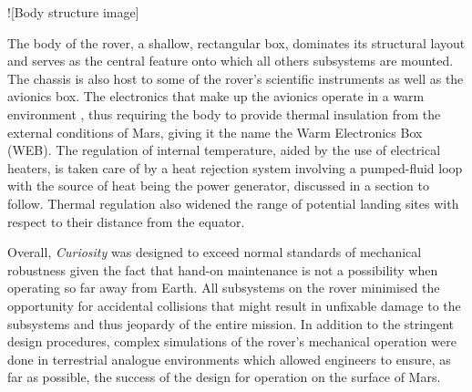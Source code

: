         ![Body structure image]
        
        The body of the rover, a shallow, rectangular box, dominates its structural layout and serves as the central feature onto which all others subsystems are mounted. The chassis is also host to some of the rover's scientific instruments as well as the avionics box. The electronics that make up the avionics operate in a warm environment \cite{nasajulypresskit}, thus requiring the body to provide thermal insulation from the external conditions of Mars, giving it the name the Warm Electronics Box (WEB). The regulation of internal temperature, aided by the use of electrical heaters, is taken care of by a heat rejection system involving a pumped-fluid loop with the source of heat being the power generator, discussed in a section to follow. Thermal regulation also widened the range of potential landing sites with respect to their distance from the equator.
        
        Overall, \textit{Curiosity} was designed to exceed normal standards of mechanical robustness given the fact that hand-on maintenance is not a possibility when operating so far away from Earth. All subsystems on the rover minimised the opportunity for accidental collisions that might result in unfixable damage to the subsystems and thus jeopardy of the entire mission. In addition to the stringent design procedures, complex simulations of the rover's mechanical operation were done in terrestrial analogue environments which allowed engineers to ensure, as far as possible, the success of the design for operation on the surface of Mars.
        
